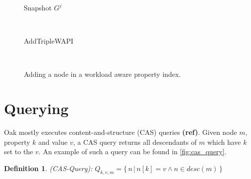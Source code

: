 \documentclass[abstracton,12pt]{scrreprt}
\newtheorem{definition}{Definition}
\begin{document}
\begin{figure}[h]
\begin{scriptsize}
\begin{multicols}{2}
\begin{multicols}{2}
\begin{center}
                    Snapshot $G^j$
                \end{center}    
            \end{multicols}
            \columnbreak
            \ 

            \vspace{12.2mm}
            \begin{algorithm}[H]
                \label{algo:add_triple_wapi}
                \caption{AddTripleWAPI}
                \DontPrintSemicolon
                \begin{scriptsize}
                    \
                    
                    \vspace{1.2mm}
                \end{scriptsize}
            \end{algorithm}

        \end{multicols}
    \end{scriptsize}
    \caption{Adding a node in a workload aware property index.}
    \label{fig:add_wapi}
\end{figure}

\section{Querying}

Oak mostly executes content-and-structure (CAS) queries \textbf{(ref)}.
Given node $m$, property $k$ and value $v$, a CAS query returns all descendants of $m$ which have $k$ set to the $v$.
An example of such a query can be found in \cref{fig:cas_query}.

\begin{definition}
    (CAS-Query): 
    {\large$Q_{k,v,m} = \{ \, n \, | \, n[k] = v \land n \in desc(m) \, \} $}
\end{definition}
\end{document}

